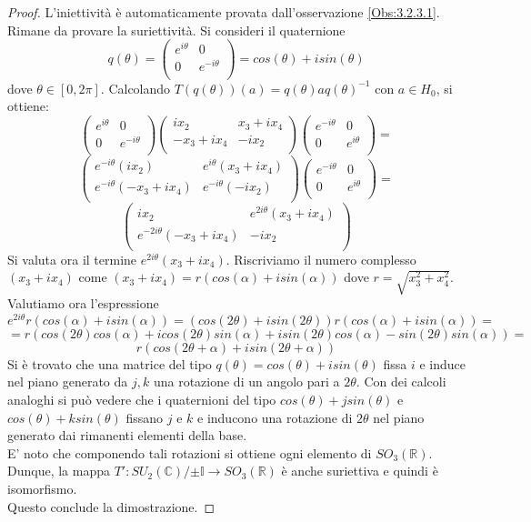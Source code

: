 \documentclass[12pt,a4paper]{report}
\theoremstyle{definition}
\theoremstyle{Theorem}
\theoremstyle{definition}
\theoremstyle{definition}
\theoremstyle{definition}
\begin{document}
\begin{proof}
	L'iniettività è automaticamente provata dall'osservazione \ref{Obs:3.2.3.1}. Rimane da provare la suriettività.
	Si consideri il quaternione 
	$$q(\theta)=
	\begin{pmatrix}
		e^{i\theta} & 0\\
		0 & e^{-i\theta}\\
	\end{pmatrix}=cos(\theta)+isin(\theta)$$
dove $\theta\in [0,2\pi]$. Calcolando $T(q(\theta))(a)=q(\theta)aq(\theta)^{-1}$ con $a\in H_0$, si ottiene:
$$\begin{pmatrix}
	e^{i\theta} & 0\\
	0 & e^{-i\theta}\\
\end{pmatrix}
\begin{pmatrix}
	ix_2 & x_3+ix_4\\
	-x_3+ix_4 & -ix_2\\
\end{pmatrix}
\begin{pmatrix}
e^{-i\theta} & 0\\
0 & e^{i\theta}\\
\end{pmatrix}=$$
$$\begin{pmatrix}
	e^{-i\theta}(ix_2) & e^{i\theta}(x_3+ix_4)\\
	e^{-i\theta}(-x_3+ix_4) & e^{-i\theta}(-ix_2)\\
\end{pmatrix}
\begin{pmatrix}
	e^{-i\theta} & 0\\
	0 & e^{i\theta}\\
\end{pmatrix}=$$
$$\begin{pmatrix}
	ix_2 & e^{2i\theta}(x_3+ix_4)\\
	e^{-2i\theta}(-x_3+ix_4) & -ix_2\\
\end{pmatrix}$$
Si valuta ora il termine $e^{2i\theta}(x_3+ix_4)$. Riscriviamo il numero complesso $(x_3+ix_4)$ come $(x_3+ix_4)=r(cos(\alpha)+isin(\alpha))$ dove $r=\sqrt{x_3^2+x_4^2}$. Valutiamo ora l'espressione 
$$e^{2i\theta}r(cos(\alpha)+isin(\alpha))=
(cos(2\theta)+isin(2\theta))r(cos(\alpha)+isin(\alpha))=$$
$$=r(cos(2\theta)cos(\alpha)+icos(2\theta)sin(\alpha)+isin(2\theta)cos(\alpha)-sin(2\theta)sin(\alpha))=$$
$$r(cos(2\theta+\alpha)+isin(2\theta+\alpha))$$
Si è trovato che una matrice del tipo $q(\theta)=cos(\theta)+isin(\theta)$ fissa $i$ e induce nel piano generato da $j,k$ una rotazione di un angolo pari a $2\theta$. Con dei calcoli analoghi si può vedere che i quaternioni del tipo $cos(\theta)+jsin(\theta)$ e $cos(\theta)+ksin(\theta)$ fissano $j$ e $k$ e inducono una rotazione di $2\theta$ nel piano generato dai rimanenti elementi della base.\\
E' noto che componendo tali rotazioni si ottiene ogni elemento di $SO_3(\mathbb{R})$. Dunque, la mappa $T':SU_2(\mathbb{C})/{\pm \mathbb{I}}\longrightarrow SO_3(\mathbb{R})$ è anche suriettiva e quindi è isomorfismo.\\
Questo conclude la dimostrazione.
\end{proof}
\end{document}
